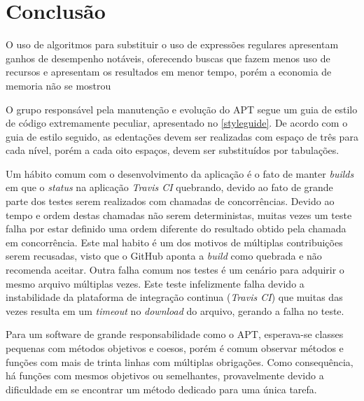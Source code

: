 \chapter{Conclusão} %
\label{cha:dificuldades_encontradas}


O uso de algoritmos para substituir o uso de expressões regulares apresentam ganhos de desempenho notáveis, oferecendo buscas que fazem menos uso de recursos e apresentam os resultados em menor tempo, porém a economia de memoria não se mostrou  


O grupo responsável pela manutenção e evolução do {\code APT} segue um guia de estilo de código extremamente peculiar, apresentado no \autoref{styleguide}. De acordo com o guia de estilo seguido, as edentações devem ser realizadas com espaço de três para cada nível, porém a cada oito espaços, devem ser substituídos por tabulações.


Um hábito comum com o desenvolvimento da aplicação é o fato de manter \textit{builds} em que o \textit{status} na aplicação \textit{Travis CI} quebrando, devido ao fato de grande parte dos testes serem realizados com chamadas de concorrências. Devido ao tempo e ordem destas chamadas não serem deterministas, muitas vezes um teste falha por estar definido uma ordem diferente do resultado obtido pela chamada em concorrência.
Este mal habito é um dos motivos de múltiplas contribuições serem recusadas, visto que o GitHub aponta a \textit{build} como quebrada e não recomenda aceitar. Outra falha comum nos testes é um cenário para adquirir o mesmo arquivo múltiplas vezes. Este teste infelizmente falha devido a instabilidade da plataforma de integração continua (\textit{Travis CI}) que muitas das vezes resulta em um \textit{timeout} no \textit{download} do arquivo, gerando a falha no teste.



Para um software de grande responsabilidade como o APT, esperava-se classes pequenas com métodos objetivos e coesos, porém é comum observar métodos e funções com mais de trinta linhas com múltiplas obrigações. Como consequência, há funções com mesmos objetivos ou semelhantes, provavelmente devido a dificuldade em se encontrar um método dedicado para uma única tarefa.

